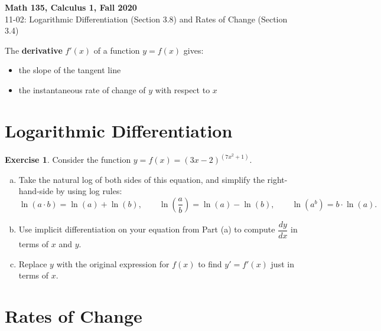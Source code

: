 \documentclass[11pt,reqno,final]{amsart}
\numberwithin{figure}{section}
\theoremstyle{definition} %
\newtheorem{exercise}[question]{Exercise}
\begin{document}
\begin{center}
        \textbf{\Large Math 135, Calculus 1, Fall 2020}\\[10pt]
        {\large 11-02: Logarithmic Differentiation (Section 3.8) and Rates of Change (Section 3.4)}
\end{center}

\thispagestyle{empty}


\renewcommand{\thesection}{\Alph{section}}


The \textbf{derivative} $f'(x)$ of a function $y=f(x)$ gives:
\begin{itemize}
\item the slope of the tangent line
\item the instantaneous rate of change of $y$ with respect to $x$
\end{itemize}


\section{Logarithmic Differentiation}

\begin{exercise}
        Consider the function $y = f(x) = (3x-2)^{(7x^2+1)}$.
        \begin{enumerate}[(a)]
        \item Take the natural log of both sides of this equation, and simplify the right-hand-side by using log rules:
                \[
                        \ln(a \cdot b) = \ln(a) + \ln(b),
                        \qquad
                        \ln\left( \frac{a}{b} \right) = \ln(a) - \ln(b),
                        \qquad
                        \ln\left(a^b\right) = b \cdot \ln(a).
                \]
                \vfill
        \item Use implicit differentiation on your equation from Part (a) to compute $\dfrac{dy}{dx}$ in terms of $x$ and $y$.
                \vfill
        \item Replace $y$ with the original expression for $f(x)$ to find $y' = f'(x)$ just in terms of $x$.
                \vfill
        \end{enumerate}
\end{exercise}

\newpage

\section{Rates of Change}
\end{document}
